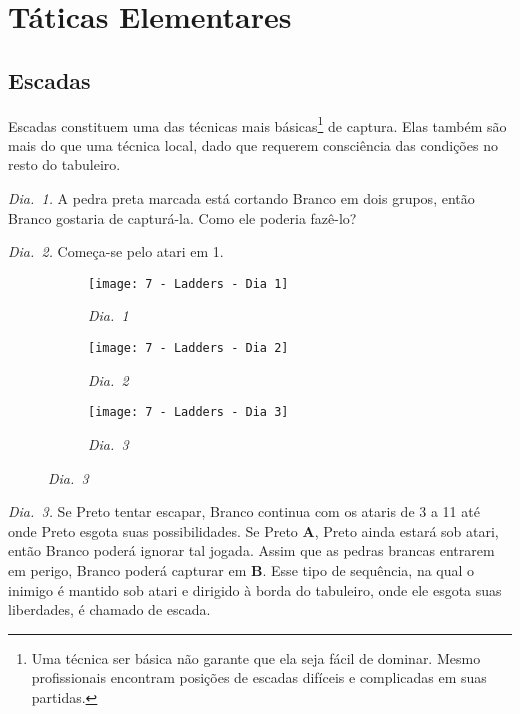 \chapter{Táticas Elementares}

\section{Escadas}

Escadas constituem uma das técnicas mais básicas\footnote{Uma técnica ser básica não garante que ela seja fácil de dominar. Mesmo profissionais encontram posições de escadas difíceis e complicadas em suas partidas.} de captura. Elas também são mais do que uma técnica local, dado que requerem consciência das condições no resto do tabuleiro.

\emph{Dia.\@~1.} A pedra preta marcada está cortando Branco em dois grupos, então Branco gostaria de capturá-la. Como ele poderia fazê-lo?

\emph{Dia.\@~2.} Começa-se pelo atari em 1.

\begin{figure}[h!]
    \centering
    \begin{subfigure}[t]{.3\textwidth}
        \centering
        \texttt{[image: 7 - Ladders - Dia 1]}
        \captionsetup{justification=centering}
        \caption*{\emph{Dia.\@~1}}
    \end{subfigure}
    \hfill
    \begin{subfigure}[t]{.3\textwidth}
        \centering
        \texttt{[image: 7 - Ladders - Dia 2]}
        \captionsetup{justification=centering}
        \caption*{\emph{Dia.\@~2}}
    \end{subfigure}
    \hfill
    \begin{subfigure}[t]{.3\textwidth}
        \centering
        \texttt{[image: 7 - Ladders - Dia 3]}
        \captionsetup{justification=centering}
        \caption*{\emph{Dia.\@~3}}
    \end{subfigure}
\end{figure}

\emph{Dia.\@~3.} Se Preto tentar escapar, Branco continua com os ataris de 3 a 11 até onde Preto esgota suas possibilidades. Se Preto \textbf{A}, Preto ainda estará sob atari, então Branco poderá ignorar tal jogada. Assim que as pedras brancas entrarem em perigo, Branco poderá capturar em \textbf{B}. Esse tipo de sequência, na qual o inimigo é mantido sob atari e dirigido à borda do tabuleiro, onde ele esgota suas liberdades, é chamado de escada.

